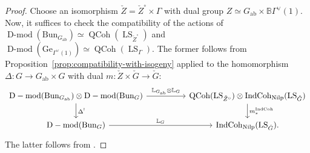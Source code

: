 \documentclass[11pt]{amsart}
\newcommand{\B}{\mathbb{B}}
\newcommand{\ab}{{\mathrm{ab}}}
\newcommand{\Ge}{\mathrm{Ge}}
\newcommand{\Bun}{{\mathrm{Bun}}}
\newcommand{\Nilp}{\mathrm{Nilp}}
\DeclareMathOperator{\QCoh}{QCoh}
\DeclareMathOperator{\Dmod}{D-mod}
\DeclareMathOperator{\IndCoh}{IndCoh}
\DeclareMathOperator{\LS}{LS}
\theoremstyle{remark}
\theoremstyle{definition}
\begin{document}
\begin{proof}
    Choose an isomorphism $\check Z=\check Z^\circ\times\Gamma$ with dual group $Z\simeq G_\ab\times\B\Gamma^\vee(1)$. Now, it suffices to check the compatibility of the actions of $\Dmod(\Bun_{G_\ab})\simeq\QCoh(\LS_{\check Z^\circ})$ and $\Dmod(\Ge_{\Gamma^\vee(1)})\simeq\QCoh(\LS_\Gamma)$. The former follows from Proposition~\ref{prop:compatibility-with-isogeny} applied to the homomorphism $\Delta\colon G\to G_\ab\times G$ with dual $m\colon\check Z\times \check G\to\check G$:
    \[
    \begin{tikzcd}
        \Dmod(\Bun_{G_\ab})\otimes\Dmod(\Bun_G)\arrow{rr}{\mathbb L_{G_\ab}\otimes\mathbb L_G}\arrow{d}{\Delta^!}&&\QCoh(\LS_{\check Z^\circ})\otimes\IndCoh_\Nilp(\LS_{\check G})\arrow{d}{m_*^{\IndCoh}}\\
        \Dmod(\Bun_G)\arrow{rr}{\mathbb L_G}&&\IndCoh_\Nilp(\LS_{\check G}).
    \end{tikzcd}
    \]
    The latter follows from \cite[\S8.5]{GLC5}.
\end{proof}
\end{document}
